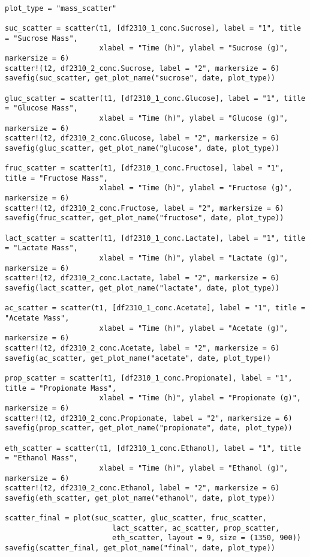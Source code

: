 \documentclass[11pt]{article}
\begin{document}
\begin{verbatim}

plot_type = "mass_scatter"

suc_scatter = scatter(t1, [df2310_1_conc.Sucrose], label = "1", title = "Sucrose Mass",
                      xlabel = "Time (h)", ylabel = "Sucrose (g)", markersize = 6)
scatter!(t2, df2310_2_conc.Sucrose, label = "2", markersize = 6)
savefig(suc_scatter, get_plot_name("sucrose", date, plot_type))

gluc_scatter = scatter(t1, [df2310_1_conc.Glucose], label = "1", title = "Glucose Mass",
                      xlabel = "Time (h)", ylabel = "Glucose (g)", markersize = 6)
scatter!(t2, df2310_2_conc.Glucose, label = "2", markersize = 6)
savefig(gluc_scatter, get_plot_name("glucose", date, plot_type))

fruc_scatter = scatter(t1, [df2310_1_conc.Fructose], label = "1", title = "Fructose Mass",
                      xlabel = "Time (h)", ylabel = "Fructose (g)", markersize = 6)
scatter!(t2, df2310_2_conc.Fructose, label = "2", markersize = 6)
savefig(fruc_scatter, get_plot_name("fructose", date, plot_type))

lact_scatter = scatter(t1, [df2310_1_conc.Lactate], label = "1", title = "Lactate Mass",
                      xlabel = "Time (h)", ylabel = "Lactate (g)", markersize = 6)
scatter!(t2, df2310_2_conc.Lactate, label = "2", markersize = 6)
savefig(lact_scatter, get_plot_name("lactate", date, plot_type))

ac_scatter = scatter(t1, [df2310_1_conc.Acetate], label = "1", title = "Acetate Mass",
                      xlabel = "Time (h)", ylabel = "Acetate (g)", markersize = 6)
scatter!(t2, df2310_2_conc.Acetate, label = "2", markersize = 6)
savefig(ac_scatter, get_plot_name("acetate", date, plot_type))

prop_scatter = scatter(t1, [df2310_1_conc.Propionate], label = "1", title = "Propionate Mass",
                      xlabel = "Time (h)", ylabel = "Propionate (g)", markersize = 6)
scatter!(t2, df2310_2_conc.Propionate, label = "2", markersize = 6)
savefig(prop_scatter, get_plot_name("propionate", date, plot_type))

eth_scatter = scatter(t1, [df2310_1_conc.Ethanol], label = "1", title = "Ethanol Mass",
                      xlabel = "Time (h)", ylabel = "Ethanol (g)", markersize = 6)
scatter!(t2, df2310_2_conc.Ethanol, label = "2", markersize = 6)
savefig(eth_scatter, get_plot_name("ethanol", date, plot_type))

scatter_final = plot(suc_scatter, gluc_scatter, fruc_scatter,
                         lact_scatter, ac_scatter, prop_scatter,
                         eth_scatter, layout = 9, size = (1350, 900))
savefig(scatter_final, get_plot_name("final", date, plot_type))

\end{verbatim}
\end{document}
